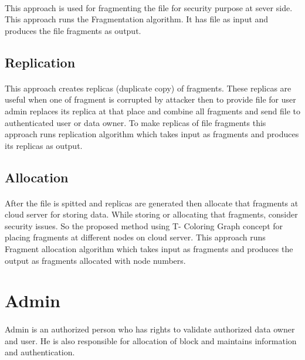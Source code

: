 \paragraph*{}
This approach is used for fragmenting the file for security purpose at sever side. This approach runs the Fragmentation algorithm. It has file as input and produces the file fragments as output.

\subsection{Replication}
\paragraph*{}
This approach creates replicas (duplicate copy) of fragments. These replicas are useful
when one of fragment is corrupted by attacker then to provide file for user admin replaces
its replica at that place and combine all fragments and send file to authenticated user or
data owner. To make replicas of file fragments this approach runs replication algorithm
which takes input as fragments and produces its replicas as output.

\subsection{Allocation}
\paragraph*{}
After the file is spitted and replicas are generated then allocate that fragments at
cloud server for storing data. While storing or allocating that fragments, consider security
issues. So the proposed method using T- Coloring Graph concept for placing fragments
at different nodes on cloud server. This approach runs Fragment allocation algorithm
which takes input as fragments and produces the output as fragments allocated with node
numbers.

\section{Admin}
\paragraph*{} 
Admin is an authorized person who has rights to validate authorized data owner
and user. He is also responsible for allocation of block and maintains information and
authentication.
